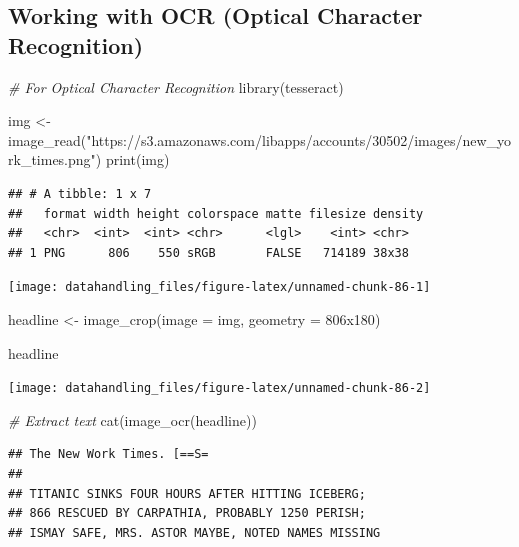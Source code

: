 \documentclass[
  12pt,
]{style/krantz}
\newenvironment{Shaded}{\begin{snugshade}}{\end{snugshade}}
\newcommand{\AttributeTok}[1]{\textcolor[rgb]{0.77,0.63,0.00}{#1}}
\newcommand{\CommentTok}[1]{\textcolor[rgb]{0.56,0.35,0.01}{\textit{#1}}}
\newcommand{\FunctionTok}[1]{\textcolor[rgb]{0.00,0.00,0.00}{#1}}
\newcommand{\NormalTok}[1]{#1}
\newcommand{\OtherTok}[1]{\textcolor[rgb]{0.56,0.35,0.01}{#1}}
\newcommand{\StringTok}[1]{\textcolor[rgb]{0.31,0.60,0.02}{#1}}
\begin{document}
\hypertarget{working-with-ocr-optical-character-recognition}{%
\subsection{Working with OCR (Optical Character Recognition)}\label{working-with-ocr-optical-character-recognition}}

\begin{Shaded}
\begin{Highlighting}[]
\CommentTok{\# For Optical Character Recognition}
\FunctionTok{library}\NormalTok{(tesseract)}

\NormalTok{img }\OtherTok{\textless{}{-}} \FunctionTok{image\_read}\NormalTok{(}\StringTok{"https://s3.amazonaws.com/libapps/accounts/30502/images/new\_york\_times.png"}\NormalTok{)}
\FunctionTok{print}\NormalTok{(img)}
\end{Highlighting}
\end{Shaded}

\begin{verbatim}
## # A tibble: 1 x 7
##   format width height colorspace matte filesize density
##   <chr>  <int>  <int> <chr>      <lgl>    <int> <chr>  
## 1 PNG      806    550 sRGB       FALSE   714189 38x38
\end{verbatim}

\texttt{[image: datahandling\_files/figure-latex/unnamed-chunk-86-1]}

\begin{Shaded}
\begin{Highlighting}[]
\NormalTok{headline }\OtherTok{\textless{}{-}} 
  \FunctionTok{image\_crop}\NormalTok{(}\AttributeTok{image =}\NormalTok{ img, }\AttributeTok{geometry =} \StringTok{\textquotesingle{}806x180\textquotesingle{}}\NormalTok{)}

\NormalTok{headline}
\end{Highlighting}
\end{Shaded}

\texttt{[image: datahandling\_files/figure-latex/unnamed-chunk-86-2]}

\begin{Shaded}
\begin{Highlighting}[]
\CommentTok{\# Extract text}
\FunctionTok{cat}\NormalTok{(}\FunctionTok{image\_ocr}\NormalTok{(headline))}
\end{Highlighting}
\end{Shaded}

\begin{verbatim}
## The New Work Times. [==S=
## 
## TITANIC SINKS FOUR HOURS AFTER HITTING ICEBERG;
## 866 RESCUED BY CARPATHIA, PROBABLY 1250 PERISH;
## ISMAY SAFE, MRS. ASTOR MAYBE, NOTED NAMES MISSING
\end{verbatim}
\end{document}
